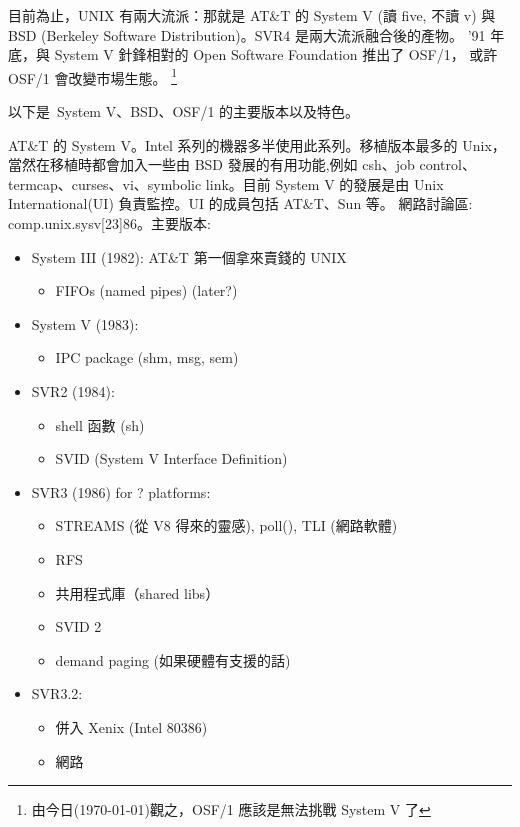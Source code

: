 \documentclass{article}
\begin{document}
\begin{CJK*}{Bg5}{ming}
{    目前為止，UNIX 有兩大流派：那就是 AT\&T 的 System V (讀 five, 不讀 v)
    與 BSD (Berkeley Software Distribution)。SVR4 是兩大流派融合後的產物。
    '91 年底，與 System V 針鋒相對的 Open Software Foundation 推出了 OSF/1，
    或許 OSF/1 會改變市場生態。
    \footnote{由今日(\today)觀之，OSF/1 應該是無法挑戰 System V 了}

    以下是~System V、BSD、OSF/1 的主要版本以及特色。
    
    AT\&T 的 System V。Intel 系列的機器多半使用此系列。移植版本最多的 Unix，
    當然在移植時都會加入一些由 BSD 發展的有用功能,例如 csh、job control、
    termcap、curses、vi、symbolic link。目前 System V 的發展是由 Unix
    International(UI) 負責監控。UI 的成員包括 AT\&T、Sun 等。
    網路討論區: comp.unix.sysv[23]86。主要版本:
\begin{itemize}
         \item  System III (1982): AT\&T 第一個拿來賣錢的 UNIX
	 \begin{itemize}
           \item FIFOs (named pipes)  (later?)
	 \end{itemize}

         \item System V (1983):
	 \begin{itemize}
           \item IPC package (shm, msg, sem)
	 \end{itemize}

         \item SVR2 (1984):
	 \begin{itemize}
           \item shell 函數 (sh)
           \item SVID (System V Interface Definition)
	 \end{itemize}

         \item SVR3 (1986) for ? platforms:
	 \begin{itemize}
           \item STREAMS (從 V8 得來的靈感), poll(), TLI (網路軟體)
           \item RFS
           \item 共用程式庫（shared libs）
           \item SVID 2
           \item demand paging (如果硬體有支援的話)
	 \end{itemize}

         \item SVR3.2:
	 \begin{itemize}
           \item 併入 Xenix (Intel 80386)
           \item 網路
	 \end{itemize}


\end{itemize}}
\end{CJK*}
\end{document}
